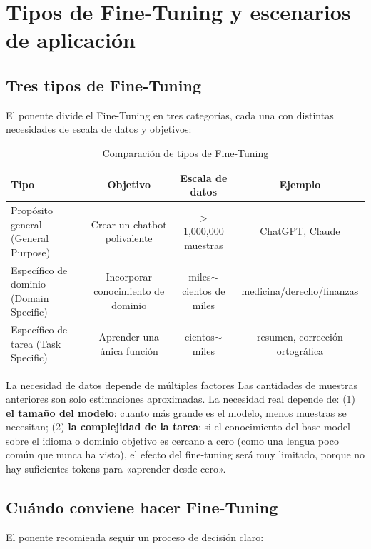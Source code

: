 \section{Tipos de Fine-Tuning y escenarios de aplicación}

\subsection{Tres tipos de Fine-Tuning}

El ponente divide el Fine-Tuning en tres categorías, cada una con distintas necesidades de escala de datos y objetivos:

\begin{table}[H]
\centering
\caption{Comparación de tipos de Fine-Tuning}
\begin{tabular}{lccc}
\toprule
\textbf{Tipo} & \textbf{Objetivo} & \textbf{Escala de datos} & \textbf{Ejemplo} \\
\midrule
Propósito general (General Purpose) & Crear un chatbot polivalente & $>$1,000,000 muestras & ChatGPT, Claude \\
Específico de dominio (Domain Specific) & Incorporar conocimiento de dominio & miles$\sim$cientos de miles & medicina/derecho/finanzas \\
Específico de tarea (Task Specific) & Aprender una única función & cientos$\sim$miles & resumen, corrección ortográfica \\
\bottomrule
\end{tabular}
\end{table}

\begin{warningbox}{La necesidad de datos depende de múltiples factores}
Las cantidades de muestras anteriores son solo estimaciones aproximadas. La necesidad real depende de: (1) \textbf{el tamaño del modelo}: cuanto más grande es el modelo, menos muestras se necesitan; (2) \textbf{la complejidad de la tarea}: si el conocimiento del base model sobre el idioma o dominio objetivo es cercano a cero (como una lengua poco común que nunca ha visto), el efecto del fine-tuning será muy limitado, porque no hay suficientes tokens para «aprender desde cero».
\end{warningbox}

\subsection{Cuándo conviene hacer Fine-Tuning}

El ponente recomienda seguir un proceso de decisión claro:

